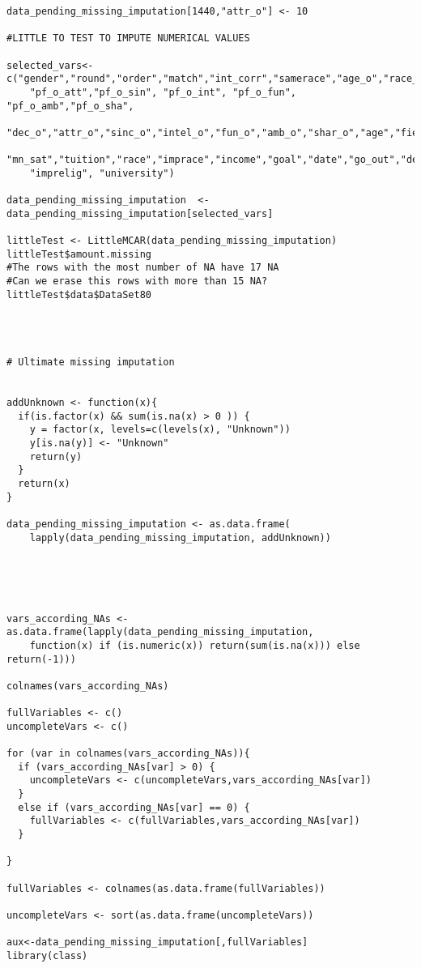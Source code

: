 \begin{verbatim}
data_pending_missing_imputation[1440,"attr_o"] <- 10

#LITTLE TO TEST TO IMPUTE NUMERICAL VALUES

selected_vars<-c("gender","round","order","match","int_corr","samerace","age_o","race_o",
    "pf_o_att","pf_o_sin", "pf_o_int", "pf_o_fun", "pf_o_amb","pf_o_sha",
    "dec_o","attr_o","sinc_o","intel_o","fun_o","amb_o","shar_o","age","field_cd",
    "mn_sat","tuition","race","imprace","income","goal","date","go_out","dec","like",
    "imprelig", "university")
    
data_pending_missing_imputation  <- data_pending_missing_imputation[selected_vars]

littleTest <- LittleMCAR(data_pending_missing_imputation)
littleTest$amount.missing
#The rows with the most number of NA have 17 NA
#Can we erase this rows with more than 15 NA?
littleTest$data$DataSet80




# Ultimate missing imputation


addUnknown <- function(x){
  if(is.factor(x) && sum(is.na(x) > 0 )) {
    y = factor(x, levels=c(levels(x), "Unknown"))
    y[is.na(y)] <- "Unknown"
    return(y)
  }
  return(x)
}

data_pending_missing_imputation <- as.data.frame(
    lapply(data_pending_missing_imputation, addUnknown))





vars_according_NAs <- as.data.frame(lapply(data_pending_missing_imputation, 
    function(x) if (is.numeric(x)) return(sum(is.na(x))) else return(-1)))

colnames(vars_according_NAs)

fullVariables <- c()
uncompleteVars <- c()

for (var in colnames(vars_according_NAs)){
  if (vars_according_NAs[var] > 0) {
    uncompleteVars <- c(uncompleteVars,vars_according_NAs[var])
  }
  else if (vars_according_NAs[var] == 0) {
    fullVariables <- c(fullVariables,vars_according_NAs[var])
  }
    
}

fullVariables <- colnames(as.data.frame(fullVariables))

uncompleteVars <- sort(as.data.frame(uncompleteVars))

aux<-data_pending_missing_imputation[,fullVariables]
library(class)









\end{verbatim}
